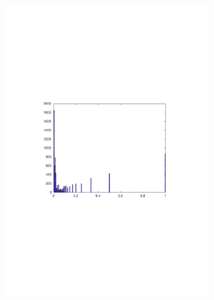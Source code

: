\documentclass[11pt]{article}\usepackage[]{graphicx}\usepackage[]{color}
\theoremstyle{plain}
\begin{document}
\begin{multicols*}{2}
  \begin{figure}[p]
    \centering
    \phantom{p}
    \vspace{-6cm}
    \begin{subfigure}[b]{.49\textwidth}
      \includegraphics[width=\textwidth, trim= 4cm 9.5cm 4cm 4cm, clip]{../figures/DYR_ECOLI_e3_n2_m40_histogram}
      \caption{ }
      \label{fig:fig1}
    \end{subfigure}~
    \begin{subfigure}[b]{.5\textwidth}

\end{subfigure}
\end{figure}
\end{multicols*}
\end{document}
